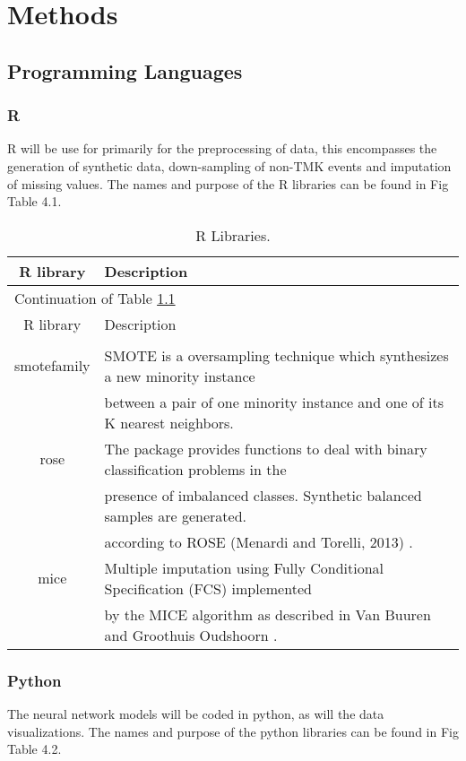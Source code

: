 \chapter{Methods}\label{ch:eval}


\section{Programming Languages}

\subsection{R}
R will be use for primarily for the preprocessing of data, this encompasses the generation of synthetic data, down-sampling of non-TMK events and imputation of missing values. The names and purpose of the R libraries can be found in Fig Table 4.1. \\

 \begin{longtable}[c]{| c | l |}
 \hline
 R library & Description\\
 \hline
 \endfirsthead

 \hline
 \multicolumn{2}{|l|}{Continuation of Table \ref{long}}\\
 \hline
 R library & Description\\
 \hline
 \endhead
 \hline
  \caption{R Libraries.\label{long}}\\
 \endlastfoot

smotefamily \cite{smotefamily} & SMOTE is a oversampling technique which synthesizes a new minority instance  \\
& between a pair of one minority instance and one of its K nearest neighbors.\\
 \hline
rose \cite{rose} & The package provides functions to deal with binary classification problems in the \\
& presence of imbalanced classes. Synthetic balanced samples are generated. \\ 
& according to ROSE (Menardi and Torelli, 2013) \cite{Lunardo}.\\
 \hline
 mice \cite{mice} & Multiple imputation using Fully Conditional Specification (FCS) implemented \\
 & by the MICE algorithm as described in Van Buuren and Groothuis Oudshoorn \cite{vanBuren}. \\
 \end{longtable}

\subsection{Python}
The neural network models will be coded in python, as will the data visualizations. The names and purpose of the python libraries can be found in Fig Table 4.2. \\


